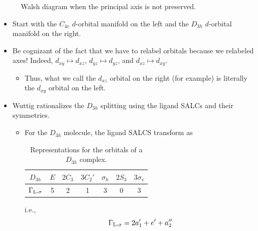 \documentclass[../notes.tex]{subfiles}
\begin{document}
\begin{itemize}
\begin{figure}[h!]
        \caption{Walsh diagram when the principal axis is not preserved.}
        \label{fig:WalshNoPrincipal}
    \end{figure}
    \begin{itemize}
        \item Start with the $C_{4v}$ $d$-orbital manifold on the left and the $D_{3h}$ $d$-orbital manifold on the right.
        \item Be cognizant of the fact that we have to relabel orbitals because we relabeled axes! Indeed, $d_{xy}\mapsto d_{xz}$, $d_{yz}\mapsto d_{yz}$, and $d_{xz}\mapsto d_{xy}$.
        \begin{itemize}
            \item Thus, what we call the $d_{xz}$ orbital on the right (for example) is literally the $d_{xy}$ orbital on the left.
        \end{itemize}
        \item Wuttig rationalizes the $D_{3h}$ splitting using the ligand SALCs and their symmetries.
        \begin{itemize}
            \item For the $D_{3h}$ molecule, the ligand SALCS transform as
            \begin{table}[H]
                \centering
                \small
                \renewcommand{\arraystretch}{1.2}
                \begin{tabular}{c|cccccc}
                    $D_{3h}$ & $E$ & $2C_3$ & $3C_2'$ & $\sigma_h$ & $2S_3$ & $3\sigma_v$\\
                    \hline
                    $\Gamma_{\ce{L}\text{-}\sigma}$ & 5 & 2 & 1 & 3 & 0 & 3\\
                \end{tabular}
                \caption{Representations for the  orbitals of a $D_{3h}$ complex.}
                \label{tab:D3hRR}
            \end{table}
            i.e.,
            \begin{equation*}
                \Gamma_{\ce{L}\text{-}\sigma} = 2a_1'+e'+a_2''
            \end{equation*}

\end{itemize}
\end{itemize}
\end{itemize}
\end{document}
